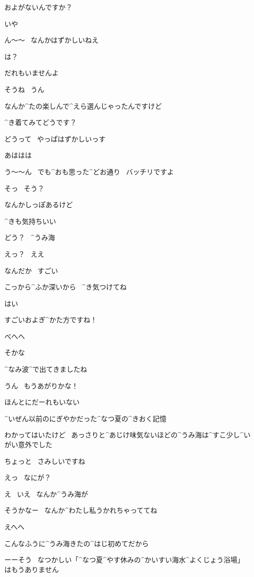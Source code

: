 \Kokone およがないんですか？

\Alpha いや

\Alpha ん〜〜
\ なんかはずかしいねえ

\Kokone は？

\Kokone だれもいませんよ

\Alpha そうね
\ うん

\page[25]
\Kokone なんか^{たの}{楽}しんで^{えら}{選}んじゃったんですけど

\Kokone ^{き}{着}てみてどうです？

\Alpha どうって
\ やっぱはずかしいっす

\Alpha あははは

\Kokone う〜〜ん
\ でも^{おも}{思}った^{どお}{通}り
\ バッチリですよ

\Alpha そっ
\ そう？

\Alpha なんかしっぽあるけど

\page[26]
\Kokone ^{きも}{気持}ちいい

\page[27]
\Alpha どう？
\ ^{うみ}{海}

\Kokone えっ？
\ ええ

\Kokone なんだか
\ すごい

\Alpha こっから^{ふか}{深}いから
\ ^{き}{気}つけてね

\Kokone はい

\page[30]
\Kokone すごいおよぎ^{かた}{方}ですね！

\Alpha べへへ

\Alpha そかな

\page[31]
\Kokone ^{なみ}{波}^{で}{出}てきましたね

\Alpha うん
\ もうあがりかな！

\Kokone ほんとにだーれもいない

\Kokone ^{いぜん}{以前}のにぎやかだった^{なつ}{夏}の^{きおく}{記憶}

\Kokone わかってはいたけど
\ あっさりと^{あじけ}{味気}ないほどの^{うみ}{海}は^{すこ}{少}し^{いがい}{意外}でした

\page[32]
\Kokone ちょっと
\ さみしいですね

\Alpha えっ
\ なにが？

\Kokone え
\ いえ
\ なんか^{うみ}{海}が

\Alpha そうかなー
\ なんか^{わたし}{私}うかれちゃっててね

\Alpha えへへ

\Alpha こんなふうに^{うみ}{海}きたの^{はじ}{初}めてだから

\page[33]
\Narrator ーーそう
\ なつかしい「^{なつ}{夏}^{やす}{休}みの^{かいすい}{海水}^{よくじょう}{浴場}」はもうありません

